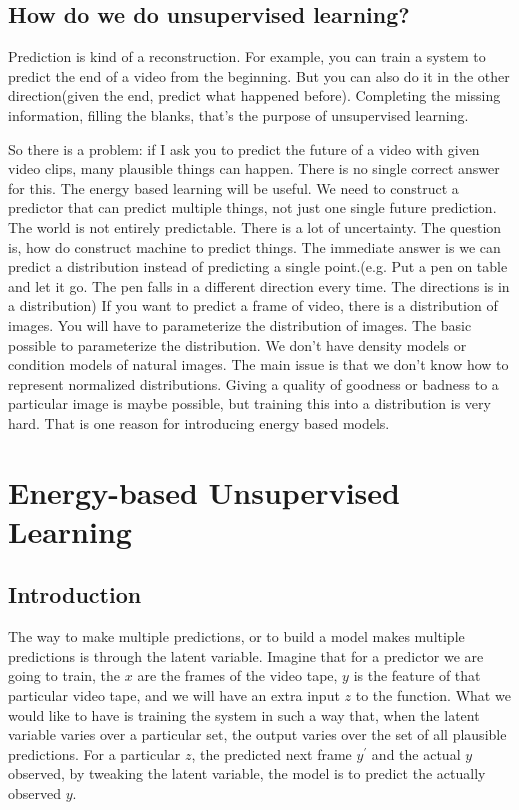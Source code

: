 \subsection{How do we do unsupervised learning?}

Prediction is kind of a reconstruction. For example, you can train a system to predict the end of a video from the beginning. But you can also do it in the other direction(given the end, predict what happened before). Completing the missing information, filling the blanks, that's the purpose of unsupervised learning.

So there is a problem: if I ask you to predict the future of a video with given video clips, many plausible things can happen. There is no single correct answer for this. The energy based learning will be useful. We need to construct a predictor that can predict multiple things, not just one single future prediction. The world is not entirely predictable. There is a lot of uncertainty. The question is, how do construct machine to predict things. The immediate answer is we can predict a distribution instead of predicting a single point.(e.g. Put a pen on table and let it go. The pen falls in a different direction every time. The directions is in a distribution) If you want to predict a frame of video, there is a distribution of images. You will have to parameterize the distribution of images. The basic possible to parameterize the distribution. We don't have density models or condition models of natural images. The main issue is that we don't know how to represent normalized distributions. Giving a quality of goodness or badness to a particular image is maybe possible, but training this into a distribution is very hard. That is one reason for introducing energy based models.

\section{Energy-based Unsupervised Learning}

\subsection{Introduction}

The way to make multiple predictions, or to build a model makes multiple predictions is through the latent variable. Imagine that for a predictor we are going to train, the $x$ are the frames of the video tape, $y$ is the feature of that particular video tape, and we will have an extra input $z$ to the function. What we would like to have is training the system in such a way that, when the latent variable varies over a particular set, the output varies over the set of all plausible predictions. For a particular $z$, the predicted next frame $y^\prime$ and the actual $y$ observed, by tweaking the latent variable, the model is to predict the actually observed $y$.

